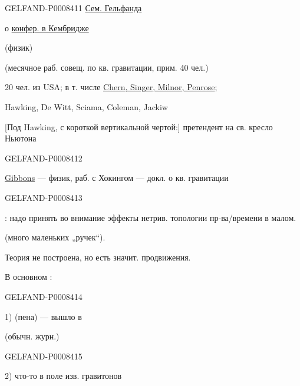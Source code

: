 \begin{GelfandAdjacentEvidence}{GELFAND-P000841}{1}
\qquad \uline{Сем. Гельфанда}

 о \uline{конфер. в Кембридже}

(физик)

(месячное раб. совещ. по кв. гравитации, прим. 40 чел.)

20 чел. из USA; в т. числе \uline{Chern, Singer, Milnor, Penrose};

Hawking, De Witt, Sciama, Coleman, Jackiw

[Под Hawking, с короткой вертикальной чертой:] претендент на св. кресло Ньютона
\end{GelfandAdjacentEvidence}
\begin{GelfandAdjacentEvidence}{GELFAND-P000841}{2}


\uline{Gibbons} — физик, раб. с Хокингом — докл. о кв. гравитации
\end{GelfandAdjacentEvidence}
\begin{GelfandAdjacentEvidence}{GELFAND-P000841}{3}


: надо принять во внимание эффекты нетрив. топологии пр-ва/времени в малом.

(много маленьких „ручек“).

Теория не построена, но есть значит. продвижения.

В основном :
\end{GelfandAdjacentEvidence}
\begin{GelfandAdjacentEvidence}{GELFAND-P000841}{4}


1)  (пена) — вышло в 

(обычн. журн.)
\end{GelfandAdjacentEvidence}
\begin{GelfandAdjacentEvidence}{GELFAND-P000841}{5}


2)  \quad что-то в поле изв. гравитонов
\end{GelfandAdjacentEvidence}
